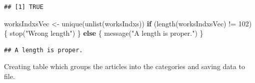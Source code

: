 \documentclass[
]{article}
\newenvironment{Shaded}{\begin{snugshade}}{\end{snugshade}}
\newcommand{\ControlFlowTok}[1]{\textcolor[rgb]{0.13,0.29,0.53}{\textbf{#1}}}
\newcommand{\DecValTok}[1]{\textcolor[rgb]{0.00,0.00,0.81}{#1}}
\newcommand{\FunctionTok}[1]{\textcolor[rgb]{0.00,0.00,0.00}{#1}}
\newcommand{\NormalTok}[1]{#1}
\newcommand{\OtherTok}[1]{\textcolor[rgb]{0.56,0.35,0.01}{#1}}
\newcommand{\SpecialCharTok}[1]{\textcolor[rgb]{0.00,0.00,0.00}{#1}}
\newcommand{\StringTok}[1]{\textcolor[rgb]{0.31,0.60,0.02}{#1}}
\begin{document}
\begin{verbatim}
## [1] TRUE
\end{verbatim}

\begin{Shaded}
\begin{Highlighting}[]
\NormalTok{worksIndxsVec }\OtherTok{\textless{}{-}} \FunctionTok{unique}\NormalTok{(}\FunctionTok{unlist}\NormalTok{(worksIndxs))}
\ControlFlowTok{if}\NormalTok{ (}\FunctionTok{length}\NormalTok{(worksIndxsVec) }\SpecialCharTok{!=} \DecValTok{102}\NormalTok{) \{}
  \FunctionTok{stop}\NormalTok{(}\StringTok{"Wrong length"}\NormalTok{)  }
\NormalTok{\} }\ControlFlowTok{else}\NormalTok{ \{}
  \FunctionTok{message}\NormalTok{(}\StringTok{"A length is proper."}\NormalTok{)}
\NormalTok{\}}
\end{Highlighting}
\end{Shaded}

\begin{verbatim}
## A length is proper.
\end{verbatim}

Creating table which groups the articles into the categories and saving data to file.
\end{document}
